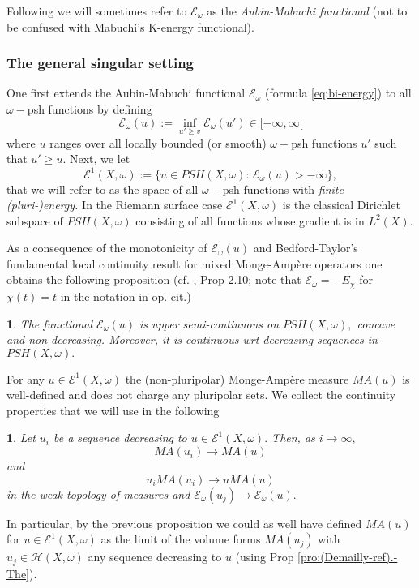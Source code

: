 \documentclass[11pt,oneside,english]{amsart}
\numberwithin{equation}{section}
\numberwithin{figure}{section}
\theoremstyle{plain}
\theoremstyle{plain}
\theoremstyle{plain}
\theoremstyle{plain}
\newtheorem{prop}[thm]{\protect\propositionname}
\theoremstyle{remark}
\theoremstyle{definition}
\providecommand{\propositionname}{Proposition}
\begin{document}
Following \cite{bbgz} we will sometimes refer to $\mathcal{E}_{\omega}$
as the \emph{Aubin-Mabuchi functional} (not to be confused with Mabuchi's
K-energy functional).

\subsubsection{The general singular setting}

One first extends the Aubin-Mabuchi functional $\mathcal{E}_{\omega}$
(formula \ref{eq:bi-energy}) to all $\omega-$psh functions by defining
\[
\mathcal{E}_{\omega}(u):=\inf_{u'\geq v}\mathcal{E}_{\omega}(u')\in[-\infty,\infty[
\]
 where $u$ ranges over all locally bounded (or smooth) $\omega-$psh
functions $u'$ such that $u'\geq u.$ Next, we let 
\[
\mathcal{E}^{1}(X,\omega):=\{u\in PSH(X,\omega):\,\mathcal{E}_{\omega}(u)>-\infty\},
\]
that we will refer to as the space of all $\omega-$psh functions
with\emph{ finite (pluri-)energy. }In the Riemann surface case $\mathcal{E}^{1}(X,\omega)$
is the classical Dirichlet subspace of $PSH(X,\omega)$ consisting
of all functions whose gradient is in $L^{2}(X).$

As a consequence of the monotonicity of $\mathcal{E}_{\omega}(u)$
and Bedford-Taylor's fundamental local continuity result for mixed
Monge-Ampère operators one obtains the following proposition (cf.
\cite{begz}, Prop 2.10; note that $\mathcal{E}_{\omega}=-E_{\chi}$
for $\chi(t)=t$ in the notation in op. cit.) 
\begin{prop}
\label{pro:energy is ups}The functional $\mathcal{E}_{\omega}(u)$
is upper semi-continuous on $PSH(X,\omega),$ concave and non-decreasing.
Moreover, it is continuous wrt decreasing sequences in $PSH(X,\omega).$
\end{prop}
For any $u\in\mathcal{E}^{1}(X,\omega)$ the (non-pluripolar) Monge-Ampère
measure $MA(u)$ is well-defined \cite{begz} and does not charge
any pluripolar sets. We collect the continuity properties that we
will use in the following \cite{begz} 
\begin{prop}
\label{pro:non-pluripol ma}Let $u_{i}$ be a sequence decreasing
to $u\in\mathcal{E}^{1}(X,\omega).$ Then, as $i\rightarrow\infty,$
\[
MA(u_{i})\rightarrow MA(u)
\]
and 
\[
u_{i}MA(u_{i})\rightarrow uMA(u)
\]
in the weak topology of measures and $\mathcal{E}_{\omega}(u_{j})\rightarrow\mathcal{E}_{\omega}(u).$ 
\end{prop}
In particular, by the previous proposition we could as well have defined
$MA(u)$ for $u\in\mathcal{E}^{1}(X,\omega)$ as the limit of the
volume forms $MA(u_{j})$ with $u_{j}\in\mathcal{H}(X,\omega)$ any
sequence decreasing to $u$ (using Prop \ref{pro:(Demailly-ref).-The}).
\end{document}
